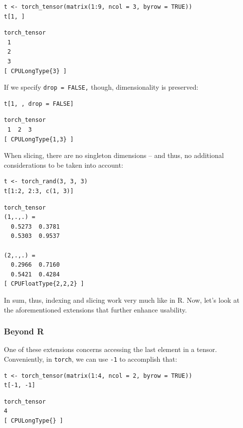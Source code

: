 \documentclass[
  letterpaper,
]{krantz}
\begin{document}
\begin{verbatim}
t <- torch_tensor(matrix(1:9, ncol = 3, byrow = TRUE))
t[1, ]
\end{verbatim}

\begin{verbatim}
torch_tensor
 1
 2
 3
[ CPULongType{3} ]
\end{verbatim}

If we specify \texttt{drop\ =\ FALSE,} though, dimensionality is
preserved:

\begin{verbatim}
t[1, , drop = FALSE]
\end{verbatim}

\begin{verbatim}
torch_tensor
 1  2  3
[ CPULongType{1,3} ]
\end{verbatim}

When slicing, there are no singleton dimensions -- and thus, no
additional considerations to be taken into account:

\begin{verbatim}
t <- torch_rand(3, 3, 3)
t[1:2, 2:3, c(1, 3)]
\end{verbatim}

\begin{verbatim}
torch_tensor
(1,.,.) = 
  0.5273  0.3781
  0.5303  0.9537

(2,.,.) = 
  0.2966  0.7160
  0.5421  0.4284
[ CPUFloatType{2,2,2} ]
\end{verbatim}

In sum, thus, indexing and slicing work very much like in R. Now, let's
look at the aforementioned extensions that further enhance usability.

\hypertarget{beyond-r}{%
\subsubsection{Beyond R}\label{beyond-r}}

One of these extensions concerns accessing the last element in a tensor.
Conveniently, in \texttt{torch}, we can use \texttt{-1} to accomplish
that:

\begin{verbatim}
t <- torch_tensor(matrix(1:4, ncol = 2, byrow = TRUE))
t[-1, -1]
\end{verbatim}

\begin{verbatim}
torch_tensor
4
[ CPULongType{} ]
\end{verbatim}
\end{document}
